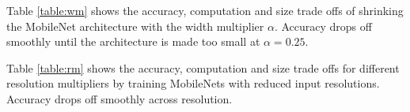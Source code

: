 \documentclass[10pt,twocolumn,letterpaper]{article}
\begin{document}
Table \ref{table:wm} shows the accuracy, computation and size trade offs of shrinking the MobileNet architecture with the width multiplier $\alpha$.
Accuracy drops off smoothly until the architecture is made too small at $\alpha=0.25$.

\begin{table}[t]
  \caption{MobileNet Width Multiplier} %
\centering %
\end{table}

Table \ref{table:rm} shows the accuracy, computation and size trade offs for different resolution multipliers by
training MobileNets with reduced input resolutions. Accuracy drops off smoothly across resolution.

\begin{table}[t]
  \caption{MobileNet Resolution} %
\centering %
\end{table}
\end{document}
